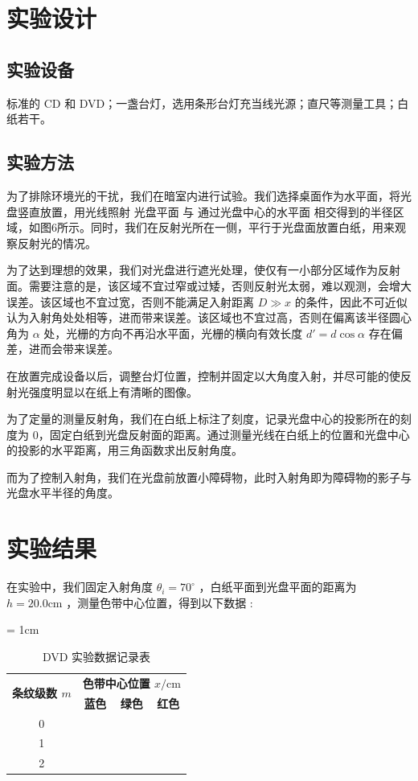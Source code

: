 \documentclass[fontset=windows]{article}
\begin{document}
\section{实验设计}

\subsection*{实验设备}

标准的 CD 和 DVD；一盏台灯，选用条形台灯充当线光源；直尺等测量工具；白纸若干。

\subsection*{实验方法}

为了排除环境光的干扰，我们在暗室内进行试验。我们选择桌面作为水平面，将光盘竖直放置，用光线照射  光盘平面  与  通过光盘中心的水平面  相交得到的半径区域，如图6所示。同时，我们在反射光所在一侧，平行于光盘面放置白纸，用来观察反射光的情况。

为了达到理想的效果，我们对光盘进行遮光处理，使仅有一小部分区域作为反射面。需要注意的是，该区域不宜过窄或过矮，否则反射光太弱，难以观测，会增大误差。该区域也不宜过宽，否则不能满足入射距离 $D \gg x$ 的条件，因此不可近似认为入射角处处相等，进而带来误差。该区域也不宜过高，否则在偏离该半径圆心角为 $\alpha$ 处，光栅的方向不再沿水平面，光栅的横向有效长度 $d' = d\cos \alpha$ 存在偏差，进而会带来误差。

在放置完成设备以后，调整台灯位置，控制并固定以大角度入射，并尽可能的使反射光强度明显以在纸上有清晰的图像。

为了定量的测量反射角，我们在白纸上标注了刻度，记录光盘中心的投影所在的刻度为 0，固定白纸到光盘反射面的距离。通过测量光线在白纸上的位置和光盘中心的投影的水平距离，用三角函数求出反射角度。

而为了控制入射角，我们在光盘前放置小障碍物，此时入射角即为障碍物的影子与光盘水平半径的角度。

\section{实验结果}

在实验中，我们固定入射角度 $\theta_i = 70^\circ$ ，白纸平面到光盘平面的距离为 $h = 20.0\mathrm{cm}$ ，测量色带中心位置，得到以下数据 :

\begin{table}[htbp]
    \centering
    \caption{DVD 实验数据记录表}
    \label{table1}
    \renewcommand\arraystretch{1.5}
    \tabcolsep = 1cm
    \begin{tabular}{|c|c|c|c|}
        \hline
        \multirow{2}{*}{\textbf{条纹级数 $m$}} & \multicolumn{3}{|c|}{\textbf{色带中心位置 $x/\mathrm{cm}$}}\\
        \cline{2-4} %
        & \textbf{蓝色} & \textbf{绿色} & \textbf{红色} \\
        \hline
        0 & & & \\
        \hline
        1 & & & \\
        \hline
        2 & & & \\
        \hline
    \end{tabular}
\end{table}
\end{document}
